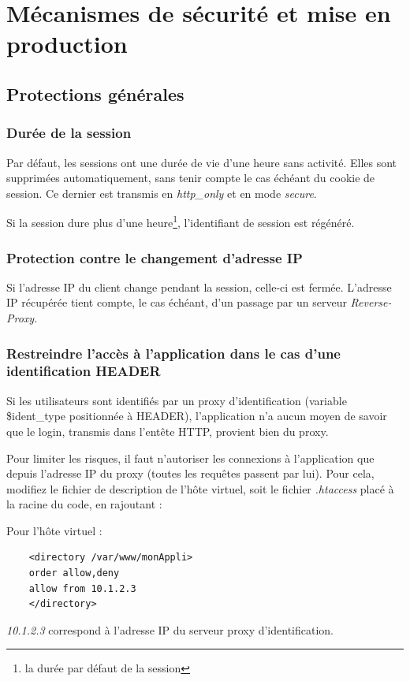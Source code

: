 \chapter{Mécanismes de sécurité et mise en production}

\section{Protections générales}
\subsection{Durée de la session}
Par défaut, les sessions ont une durée de vie d'une heure sans activité. Elles sont supprimées automatiquement, sans tenir compte le cas échéant du cookie de session. Ce dernier est transmis en \textit{http\_only} et en mode \textit{secure}.

Si la session dure plus d'une heure\footnote{la durée par défaut de la session}, l'identifiant de session est régénéré.

\subsection{Protection contre le changement d'adresse IP}

Si l'adresse IP du client change pendant la session, celle-ci est fermée. L'adresse IP récupérée tient compte, le cas échéant, d'un passage par un serveur \textit{Reverse-Proxy}.

\subsection{Restreindre l'accès à l'application dans le cas d'une identification HEADER}

Si les utilisateurs sont identifiés par un proxy d'identification (variable \$ident\_type positionnée à HEADER), l'application n'a aucun moyen de savoir que le login, transmis dans l'entête HTTP, provient bien du proxy.

Pour limiter les risques, il faut n'autoriser les connexions à l'application que depuis l'adresse IP du proxy (toutes les requêtes passent par lui). Pour cela, modifiez le fichier de description de l'hôte virtuel, soit le fichier \textit{.htaccess} placé à la racine du code, en rajoutant :

Pour l'hôte virtuel :
\begin{lstlisting}
    <directory /var/www/monAppli>
    order allow,deny
    allow from 10.1.2.3
    </directory>
\end{lstlisting} 
\textit{10.1.2.3} correspond à l'adresse IP du serveur proxy d'identification.

